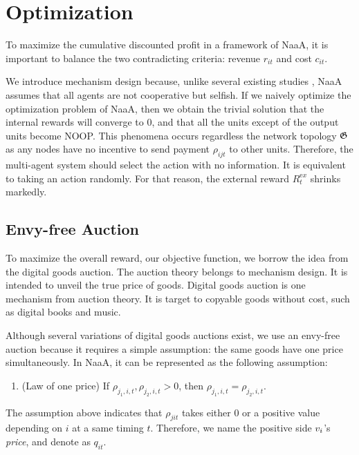 \section{Optimization}
To maximize the cumulative discounted profit in a framework of NaaA,
it is important to balance the two contradicting criteria: revenue $r_{it}$ and cost $c_{it}$.



We introduce mechanism design because, unlike several existing studies \citep{sukhbaatar2016learning}, NaaA assumes that all agents are not cooperative but selfish.
If we naively optimize the optimization problem of NaaA, then we obtain the trivial solution that the internal rewards will converge to 0, and that all the units except of the output units become NOOP.
This phenomena occurs regardless the network topology $\mathfrak{G}$ as any nodes have no incentive to send payment $\rho_{ijt}$ to other units.
Therefore, the multi-agent system should select the action with no information. It is equivalent to taking an action randomly.
For that reason, the external reward $R_t^{\mathrm ex}$ shrinks markedly.

\subsection{Envy-free Auction}
To maximize the overall reward, our objective function, we borrow the idea from the digital goods auction.
The auction theory belongs to mechanism design. It is intended to unveil the true price of goods.
Digital goods auction is one mechanism from auction theory.
It is target to copyable goods without cost, such as digital books and music.

Although several variations of digital goods auctions exist,
we use an envy-free auction \citep{guruswami2005profit} because it requires a simple assumption: the same goods have one price simultaneously.
In NaaA, it can be represented as the following assumption:
\begin{enumerate}
\renewcommand{\labelenumi}{N\arabic{enumi}:}
\setcounter{enumi}{4}
\item (Law of one price)
	If $\rho_{j_1,i,t}, \rho_{j_2,i,t} > 0$, then $\rho_{j_1,i,t} = \rho_{j_2,i,t}$.
\end{enumerate}
The assumption above indicates that $\rho_{jit}$ takes either 0 or a positive value depending on $i$ at a same timing $t$.
Therefore, we name the positive side $v_{i}$'s {\em price}, and denote as $q_{it}$.

